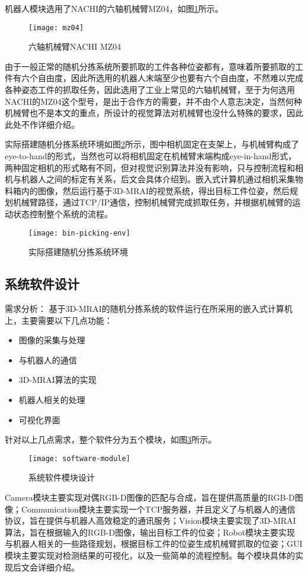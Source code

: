 机器人模块选用了NACHI的六轴机械臂MZ04，如图\ref{fig:mz04}所示。
\begin{figure}[ht]
  \centering
  \texttt{[image: mz04]}
  \caption{六轴机械臂NACHI MZ04}
  \label{fig:mz04}
\end{figure}
由于一般正常的随机分拣系统所要抓取的工件各种位姿都有，意味着所要抓取的工件有六个自由度，因此所选用的机器人末端至少也要有六个自由度，不然难以完成各种姿态工件的抓取任务，因此选用了工业上常见的六轴机械臂，至于为何选用NACHI的MZ04这个型号，是出于合作方的需要，并不由个人意志决定，当然何种机械臂也不是本文的重点，所设计的视觉算法对机械臂也没什么特殊的要求，因此此处不作详细介绍。

实际搭建随机分拣系统环境如图\ref{fig:bin-picking-env}所示，图中相机固定在支架上，与机械臂构成了eye-to-hand的形式，当然也可以将相机固定在机械臂末端构成eye-in-hand形式，两种固定相机的形式略有不同，但对视觉识别算法并没有影响，只与控制流程和相机与机器人之间的标定有关系，后文会具体介绍到。嵌入式计算机通过相机采集物料箱内的图像，然后运行基于3D-MRAI的视觉系统，得出目标工件位姿，然后规划机械臂路径，通过TCP/IP通信，控制机械臂完成抓取任务，并根据机械臂的运动状态控制整个系统的流程。
\begin{figure}[ht]
  \centering
  \texttt{[image: bin-picking-env]}
  \caption{实际搭建随机分拣系统环境}
  \label{fig:bin-picking-env}
\end{figure}

\subsection{系统软件设计}
\label{sec:hand_eye}
{\kai 需求分析：}
基于3D-MRAI的随机分拣系统的软件运行在所采用的嵌入式计算机上，主要需要以下几点功能：
\begin{itemize}
\item 图像的采集与处理
\item 与机器人的通信
\item 3D-MRAI算法的实现
\item 机器人相关的处理
\item 可视化界面
\end{itemize}
针对以上几点需求，整个软件分为五个模块，如图\ref{fig:software-module}所示。
\begin{figure}[ht]
  \centering
  \texttt{[image: software-module]}
  \caption{系统软件模块设计}
  \label{fig:software-module}
\end{figure}
Camera模块主要实现对偶RGB-D图像的匹配与合成，旨在提供高质量的RGB-D图像；Communication模块主要实现一个TCP服务器，并且定义了与机器人的通信协议，旨在提供与机器人高效稳定的通讯服务；Vision模块主要实现了3D-MRAI算法，旨在根据输入的RGB-D图像，输出目标工件的位姿；Robot模块主要实现与机器人相关的一些路径规划，根据目标工件的位姿生成机械臂抓取的位姿；GUI模块主要实现对检测结果的可视化，以及一些简单的流程控制。每个模块具体的实现后文会详细介绍。

